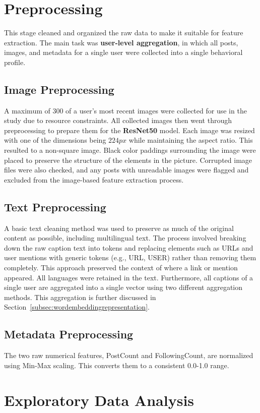 \section{Preprocessing}
This stage cleaned and organized the raw data to make it suitable for feature extraction. The main task was \textbf{user-level aggregation}, in which all posts, images, and metadata for a single user were collected into a single behavioral profile. 

\subsection{Image Preprocessing}
A maximum of 300 of a user's most recent images were collected for use in the study due to resource constraints. All collected images then went through preprocessing to prepare them for the \textbf{ResNet50} model. Each image was resized with one of the dimensions being \(224px\) while maintaining the aspect ratio. This resulted to a non-square image. Black color paddings surrounding the image were placed to preserve the structure of the elements in the picture. Corrupted image files were also checked, and any posts with unreadable images were flagged and excluded from the image-based feature extraction process.

\subsection{Text Preprocessing}
A basic text cleaning method was used to preserve as much of the original content as possible, including multilingual text. The process involved breaking down the raw caption text into tokens and replacing elements such as URLs and user mentions with generic tokens (e.g., URL, USER) rather than removing them completely. This approach preserved the context of where a link or mention appeared. All languages were retained in the text. Furthermore, all captions of a single user are aggregated into a single vector using two different aggregation methods. This aggregation is further discussed in Section~\ref{subsec:wordembeddingrepresentation}.

\subsection{Metadata Preprocessing}
The two raw numerical features, PostCount and FollowingCount, are normalized using Min-Max scaling. This converts them to a consistent 0.0-1.0 range.


\section{Exploratory Data Analysis}
\label{subsec:eda}

